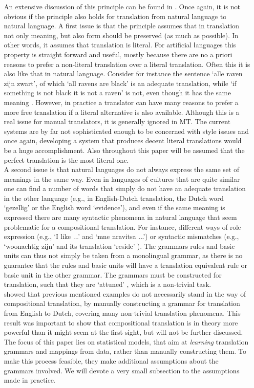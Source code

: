 \documentclass[a4paper, 11pt]{report}
\newcommand\textcyr[1]{{\fontencoding{OT2}\fontfamily{wncyr}\selectfont #1}}
\theoremstyle{definition}
\theoremstyle{plain}
\begin{document}
An extensive discussion of this principle can be found in \cite{janssen1998algebraic}. Once again, it is not obvious if the principle also holds for translation from natural language to natural language. A first issue is that the principle assumes that in translation not only meaning, but also form should be preserved (as much as possible). In other words, it assumes that translation is literal. For artificial languages this property is straight forward and useful, mostly because there are no a priori reasons to prefer a non-literal translation over a literal translation. Often this it is also like that in natural language. Consider for instance the sentence `alle raven zijn zwart', of which `all ravens are black' is an adequate translation, while `if something is not black it is not a raven' is not, even though it has the same meaning \citep{landsbergen1989power}. However, in practice a translator can have many reasons to prefer a more free translation if a literal alternative is also available. Although this is a real issue for manual translators, it is generally ignored in MT. The current systems are by far not sophisticated enough to be concerned with style issues and once again, developing a system that produces decent literal translations would be a huge accomplishment. Also throughout this paper will be assumed that the perfect translation is the most literal one.\\
A second issue is that natural languages do not always express the same set of meanings in the same way. Even in languages of cultures that are quite similar one can find a number of words that simply do not have an adequate translation in the other language (e.g., in English-Dutch translation, the Dutch word `gezellig' or the English word `evidence'), and even if the same meaning is expressed there are many syntactic phenomena in natural language that seem problematic for a compositional translation. For instance, different ways of role expression (e.g., `I like ...' and `\textcyr{mne nravitsa ...}') or syntactic mismatches (e.g., `woonachtig zijn' and its translation `reside' \citep{landsbergen1989power}). The grammars rules and basic units can thus not simply be taken from a monolingual grammar, as there is no guarantee that the rules and basic units will have a translation equivalent rule or basic unit in the other grammar. The grammars must be constructed for translation, such that they are `attuned' \citep{rosetta1994compositional}, which is a non-trivial task.\\
\cite{rosetta1994compositional} showed that previous mentioned examples do not necessarily stand in the way of compositional translation, by manually constructing a grammar for translation from English to Dutch, covering many non-trivial translation phenomena. This result was important to show that compositional translation is in theory more powerful than it might seem at the first sight, but will not be further discussed. The focus of this paper lies on statistical models, that aim at \textit{learning} translation grammars and mappings from data, rather than manually constructing them. To make this process feasible, they make additional assumptions about the grammars involved. We will devote a very small subsection to the assumptions made in practice.
\end{document}
